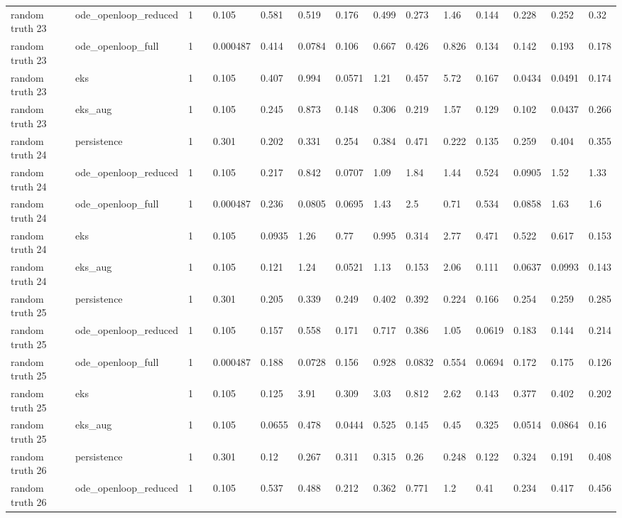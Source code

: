 \begin{table}[t]
\begin{tabular}{lllllllllllllll}
random truth 23 & ode\_openloop\_reduced & 1 &  & 0.105 & 0.581 & 0.519 & 0.176 & 0.499 & 0.273 & 1.46 & 0.144 & 0.228 & 0.252 & 0.32 \\
random truth 23 & ode\_openloop\_full & 1 &  & 0.000487 & 0.414 & 0.0784 & 0.106 & 0.667 & 0.426 & 0.826 & 0.134 & 0.142 & 0.193 & 0.178 \\
random truth 23 & eks & 1 &  & 0.105 & 0.407 & 0.994 & 0.0571 & 1.21 & 0.457 & 5.72 & 0.167 & 0.0434 & 0.0491 & 0.174 \\
random truth 23 & eks\_aug & 1 &  & 0.105 & 0.245 & 0.873 & 0.148 & 0.306 & 0.219 & 1.57 & 0.129 & 0.102 & 0.0437 & 0.266 \\
random truth 24 & persistence & 1 &  & 0.301 & 0.202 & 0.331 & 0.254 & 0.384 & 0.471 & 0.222 & 0.135 & 0.259 & 0.404 & 0.355 \\
random truth 24 & ode\_openloop\_reduced & 1 &  & 0.105 & 0.217 & 0.842 & 0.0707 & 1.09 & 1.84 & 1.44 & 0.524 & 0.0905 & 1.52 & 1.33 \\
random truth 24 & ode\_openloop\_full & 1 &  & 0.000487 & 0.236 & 0.0805 & 0.0695 & 1.43 & 2.5 & 0.71 & 0.534 & 0.0858 & 1.63 & 1.6 \\
random truth 24 & eks & 1 &  & 0.105 & 0.0935 & 1.26 & 0.77 & 0.995 & 0.314 & 2.77 & 0.471 & 0.522 & 0.617 & 0.153 \\
random truth 24 & eks\_aug & 1 &  & 0.105 & 0.121 & 1.24 & 0.0521 & 1.13 & 0.153 & 2.06 & 0.111 & 0.0637 & 0.0993 & 0.143 \\
random truth 25 & persistence & 1 &  & 0.301 & 0.205 & 0.339 & 0.249 & 0.402 & 0.392 & 0.224 & 0.166 & 0.254 & 0.259 & 0.285 \\
random truth 25 & ode\_openloop\_reduced & 1 &  & 0.105 & 0.157 & 0.558 & 0.171 & 0.717 & 0.386 & 1.05 & 0.0619 & 0.183 & 0.144 & 0.214 \\
random truth 25 & ode\_openloop\_full & 1 &  & 0.000487 & 0.188 & 0.0728 & 0.156 & 0.928 & 0.0832 & 0.554 & 0.0694 & 0.172 & 0.175 & 0.126 \\
random truth 25 & eks & 1 &  & 0.105 & 0.125 & 3.91 & 0.309 & 3.03 & 0.812 & 2.62 & 0.143 & 0.377 & 0.402 & 0.202 \\
random truth 25 & eks\_aug & 1 &  & 0.105 & 0.0655 & 0.478 & 0.0444 & 0.525 & 0.145 & 0.45 & 0.325 & 0.0514 & 0.0864 & 0.16 \\
random truth 26 & persistence & 1 &  & 0.301 & 0.12 & 0.267 & 0.311 & 0.315 & 0.26 & 0.248 & 0.122 & 0.324 & 0.191 & 0.408 \\
random truth 26 & ode\_openloop\_reduced & 1 &  & 0.105 & 0.537 & 0.488 & 0.212 & 0.362 & 0.771 & 1.2 & 0.41 & 0.234 & 0.417 & 0.456 \\

\end{tabular}
\end{table}
